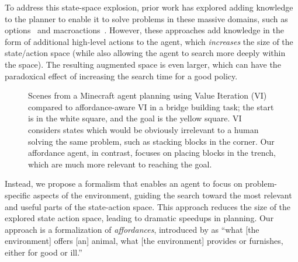 \documentclass[]{article}
\begin{document}
To address this state-space explosion, prior work has explored adding
knowledge to the planner to enable it to solve problems in these
massive domains, such as options~\citep{sutton99} and
macroactions~\citep{Botea:2005kx,Newton:2005vn}. However, these
approaches add knowledge in the form of additional high-level actions
to the agent, which {\em increases} the size of the state/action space
(while also allowing the agent to search more deeply within the
space).  The resulting augmented space is even larger, which can have
the paradoxical effect of increasing the search time for a good
policy.

\begin{figure}
\centering
%
%
  \caption{Scenes from a Minecraft agent planning using Value
    Iteration (VI) compared to affordance-aware VI in a bridge
    building task; the start is in the white square, and the goal is
    the yellow square.  VI considers states which would be obviously
    irrelevant to a human solving the same problem, such as stacking
    blocks in the corner.  Our affordance agent, in contrast, focuses
    on placing blocks in the trench, which are much more relevant to
    reaching the goal.\label{fig:minecraft}}
\end{figure}

Instead, we propose a formalism that enables an agent to focus on
problem-specific aspects of the environment, guiding the search toward
the most relevant and useful parts of the state-action space.  This
approach reduces the size of the explored state action space, leading
to dramatic speedups in planning.  Our approach is a formalization of
{\em affordances}, introduced by \citet{gibson77} as ``what [the
  environment] offers [an] animal, what [the environment] provides or
furnishes, either for good or ill.''
      
\end{document}
